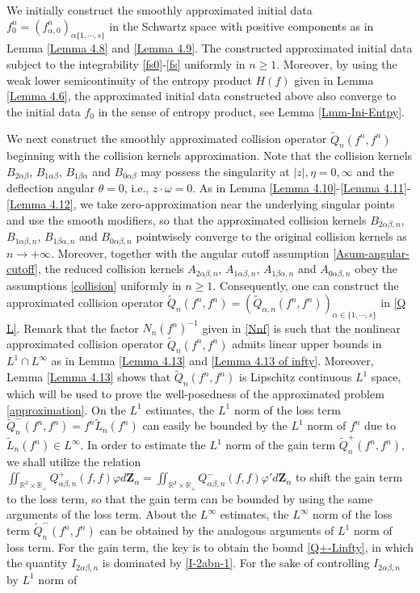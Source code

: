 \documentclass[reqno,11pt]{amsart}
\numberwithin{equation}{section}
\def\R{\mathbb{R}}
\begin{document}
We initially construct the smoothly approximated initial data $f^n_0 = (f^n_{\alpha, 0})_{ \alpha \{ 1, \cdots, s \} }$ in the Schwartz space with positive components as in Lemma \ref{Lemma 4.8} and \ref{Lemma 4.9}. The constructed approximated initial data subject to the integrability \eqref{fs0}-\eqref{fs} uniformly in $n \geq 1$. Moreover, by using the weak lower semicontinuity of the entropy product $H(f)$ given in Lemma \ref{Lemma 4.6}, the approximated initial data constructed above also converge to the initial data $f_0$ in the sense of entropy product, see Lemma \ref{Lmm-Ini-Entpy}.

We next construct the smoothly approximated collision operator $\tilde{Q}_{n} (f^n, f^n)$ beginning with the collision kernels approximation. Note that the collision kernels $B_{2 \alpha \beta}$, $B_{1 \alpha \beta}$, $B_{1 \beta \alpha}$ and $B_{0 \alpha \beta}$ may possess the singularity at $|z|, \eta = 0, \infty$ and the deflection angular $\theta = 0$, i.e., $z \cdot \omega = 0$. As in Lemma \ref{Lemma 4.10}-\ref{Lemma 4.11}-\ref{Lemma 4.12}, we take zero-approximation near the underlying singular points and use the smooth modifiers, so that the approximated collision kernels $B_{2 \alpha \beta, n}$, $B_{1 \alpha \beta, n}$, $B_{1 \beta \alpha, n}$ and $B_{0 \alpha \beta, n}$ pointwisely converge to the original collision kernels as $n \to + \infty$. Moreover, together with the angular cutoff assumption \eqref{Asum-angular-cutoff}, the reduced collision kernels $A_{2 \alpha \beta, n}$, $A_{1 \alpha \beta, n}$, $A_{1 \beta \alpha, n}$ and $A_{0 \alpha \beta, n}$ obey the assumptions \eqref{collision} uniformly in $n \geq 1$. Consequently, one can construct the approximated collision operator $\tilde{Q}_n (f^n, f^n) = ( \tilde{Q}_{\alpha, n} (f^n, f^n) )_{\alpha \in \{ 1, \cdots, s \}}$ in \eqref{Q L}. Remark that the factor $N_n (f^n)^{-1}$ given in \eqref{Nnf} is such that the nonlinear approximated collision operator $\tilde{Q}_n (f^n, f^n)$ admits linear upper bounds in $L^1 \cap L^\infty$ as in Lemma \ref{Lemma 4.13} and \ref{Lemma 4.13 of infty}. Moreover, Lemma \ref{Lemma 4.13} shows that $\tilde{Q}_n (f^n, f^n)$ is Lipschitz continuous $L^1$ space, which will be used to prove the well-posedness of the approximated problem \eqref{approximation}. On the $L^1$ estimates, the $L^1$ norm of the loss term $\tilde{Q}^-_n (f^n, f^n) = f^n \tilde{L}_{n} (f^n)$ can easily be bounded by the $L^1$ norm of $f^n$ due to $\tilde{L}_{n} (f^n) \in L^\infty$. In order to estimate the $L^1$ norm of the gain term $\tilde{Q}^+_n (f^n, f^n)$, we shall utilize the relation $ \iint_{ \R^3\times \R_+}Q^+_{\alpha \beta ,n}(f,f) \varphi d \mathbf{Z}_\alpha = \iint_{ \R^3\times \R_+} Q^-_{ \alpha \beta,n }(f,f) \varphi' d \mathbf{Z}_\alpha $ to shift the gain term to the loss term, so that the gain term can be bounded by using the same arguments of the loss term. About the $L^\infty$ estimates, the $L^\infty$ norm of the loss term $\tilde{Q}^-_n (f^n, f^n)$ can be obtained by the analogous arguments of $L^1$ norm of loss term. For the gain term, the key is to obtain the bound \eqref{Q+-Linfty}, in which the quantity $I_{2 \alpha \beta, n}$ is dominated by \eqref{I-2abn-1}. For the sake of controlling $I_{2 \alpha \beta, n}$ by $L^1$ norm of 
\end{document}
